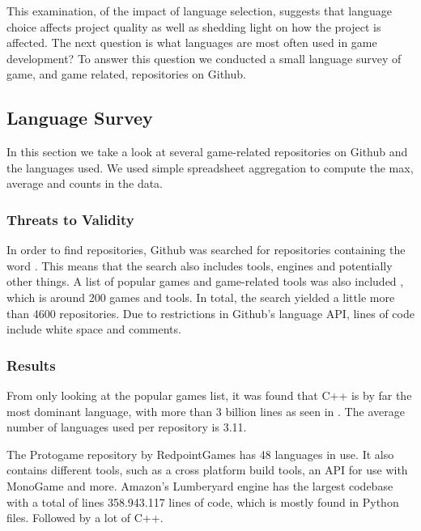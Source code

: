 This examination, of the impact of language selection, suggests that language choice affects project quality as well as shedding light on how the project is affected. The next question is what languages are most often used in game development? To answer this question we conducted a small language survey of game, and game related, repositories on Github.

\subsection{Language Survey}
In this section we take a look at several game-related repositories on Github and the languages used. We used simple spreadsheet aggregation to compute the max, average and counts in the data.

\subsubsection{Threats to Validity}
In order to find repositories, Github was searched for repositories containing the word . This means that the search also includes tools, engines and potentially other things.
A list of popular games and game-related tools was also included \cite{gitgames}, which is around 200 games and tools.
In total, the search yielded a little more than 4600 repositories.
Due to restrictions in Github's language \ac{API}, lines of code include white space and comments.

\subsubsection{Results}
From only looking at the popular games list, it was found that C++ is by far the most dominant language, with more than 3 billion lines as seen in . The average number of languages used per repository is 3.11.

The Protogame repository by RedpointGames has 48 languages in use. It also contains different tools, such as a cross platform build tools, an \ac{API} for use with MonoGame and more. Amazon's Lumberyard engine has the largest codebase with a total of lines 358.943.117 lines of code, which is mostly found in Python files. Followed by a lot of C++.

